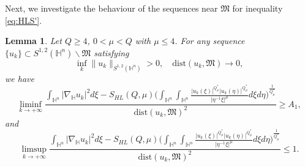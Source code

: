 \documentclass[11pt]{article}
\newtheorem{lemma}{Lemma}[section]
\begin{document}
Next, we investigate the behaviour of the sequences near $\mathfrak{M}$ for inequality \eqref{eq:HLS'}.
\begin{lemma}\label{local}
Let $Q\geq 4$, $0<\mu< Q$ with $\mu\leq 4$. For any sequence $\{u_k\}\subset S^{1,2}(\mathbb{H}^{n})\backslash \mathfrak{M}$ satisfying
\begin{equation*}
  \inf\limits_k \|u_k\|_{S^{1,2}(\mathbb{H}^{n})}>0,\quad \mathrm{dist}(u_k,\mathfrak{M})\rightarrow0,
\end{equation*}
we have
\begin{equation}\label{local1}
  \liminf\limits_{k\rightarrow+\infty}\frac{\int_{\mathbb{H}^{n}}|\nabla_{\mathbb{H}} u_k|^{2}{d}\xi-S_{HL}(Q,\mu)	\Big(\int_{\mathbb{H}^{n}}\int_{\mathbb{H}^{n}}\frac{|u_k(\xi)|^{Q^{\ast}_{\mu}}|u_k(\eta)|
^{Q^{\ast}_{\mu}}}{|\eta^{-1}\xi|^{\mu}}{d}\xi{d}\eta\Big)^{\frac{1}{Q^{\ast}_{\mu}}}}{\mathrm{dist}(u_k,\mathfrak{M})^2}\geq A_1,
\end{equation}
and
\begin{equation}\label{local2}
  \limsup\limits_{k\rightarrow+\infty}\frac{\int_{\mathbb{H}^{n}}|\nabla_{\mathbb{H}} u_k|^{2}{d}\xi-S_{HL}(Q,\mu)	\Big(\int_{\mathbb{H}^{n}}\int_{\mathbb{H}^{n}}\frac{|u_k(\xi)|^{Q^{\ast}_{\mu}}|u_k(\eta)|
^{Q^{\ast}_{\mu}}}{|\eta^{-1}\xi|^{\mu}}{d}\xi{d}\eta\Big)^{\frac{1}{Q^{\ast}_{\mu}}}}{\mathrm{dist}(u_k,\mathfrak{M})^2}\leq 1.
\end{equation}
\end{lemma}
\end{document}
